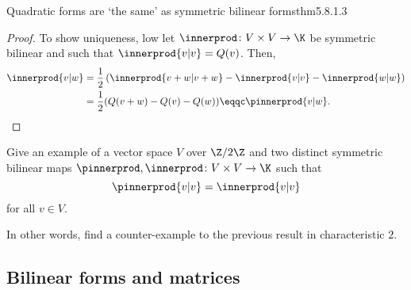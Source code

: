 \begin{thm}{Quadratic forms are `the same' as symmetric bilinear forms}{thm5.8.1.3}
\begin{proof}
		To show uniqueness, low let $\innerprod \colon V\times V\rightarrow \K$ be symmetric bilinear and such that $\innerprod{v|v}=Q(v)$.  Then,
		\begin{equation}
			\begin{split}
				\innerprod{v|w} & =\frac{1}{2}\left( \innerprod{v+w|v+w}-\innerprod{v|v}-\innerprod{w|w}\right) \\
				& =\frac{1}{2}(Q(v+w)-Q(v)-Q(w))\eqqc \pinnerprod{v|w}.
			\end{split}
		\end{equation}
	\end{proof}
\end{thm}
\begin{exr}{}{}
	Give an example of a vector space $V$ over $\Z /2\Z$ and two distinct symmetric bilinear maps $\pinnerprod ,\innerprod \colon V\times V\rightarrow \K$ such that
	\begin{equation}
		\pinnerprod{v|v}=\innerprod{v|v}
	\end{equation}
	for all $v\in V$.
	\begin{rmk}
		In other words, find a counter-example to the previous result in characteristic $2$.
	\end{rmk}
\end{exr}

\subsection{Bilinear forms and matrices}


